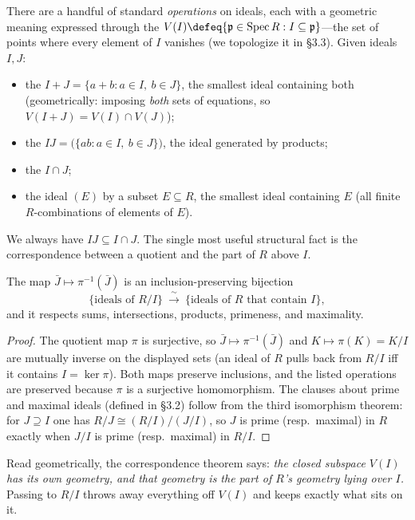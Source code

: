 \documentclass[11pt]{article}
\DeclareMathOperator{\Spec}{Spec}
\newcommand{\mfp}{\mathfrak{p}}
\begin{document}
There are a handful of standard \emph{operations} on ideals, each with a geometric meaning
expressed through the  $V(I)\defeq\{\mfp\in\Spec R: I\subseteq\mfp\}$---the
set of points where every element of $I$ vanishes (we topologize it in \S3.3). Given ideals
$I,J$:
\begin{itemize}\setlength{\itemsep}{2pt}
\item the  $I+J=\{a+b: a\in I,\ b\in J\}$, the smallest ideal containing both
(geometrically: imposing \emph{both} sets of equations, so $V(I+J)=V(I)\cap V(J)$);
\item the  $IJ=\big(\{ab:a\in I,\ b\in J\}\big)$, the ideal generated by products;
\item the  $I\cap J$;
\item the ideal $(E)$  by a subset $E\subseteq R$, the smallest ideal
containing $E$ (all finite $R$-combinations of elements of $E$).
\end{itemize}
We always have $IJ\subseteq I\cap J$. The single most useful structural fact is the
correspondence between a quotient and the part of $R$ above $I$.

\begin{pproposition}
The map $\bar J\mapsto \pi^{-1}(\bar J)$ is an inclusion-preserving bijection
\[
\{\text{ideals of } R/I\}\ \xrightarrow{\ \sim\ }\ \{\text{ideals of } R \text{ that contain } I\},
\]
and it respects sums, intersections, products, primeness, and maximality.
\end{pproposition}

\begin{proof}
The quotient map $\pi$ is surjective, so $\bar J\mapsto\pi^{-1}(\bar J)$ and
$K\mapsto \pi(K)=K/I$ are mutually inverse on the displayed sets (an ideal of $R$ pulls back
from $R/I$ iff it contains $I=\ker\pi$). Both maps preserve inclusions, and the listed
operations are preserved because $\pi$ is a surjective homomorphism. The clauses about prime
and maximal ideals (defined in \S3.2) follow from the third isomorphism theorem: for
$J\supseteq I$ one has $R/J\cong (R/I)\big/(J/I)$, so $J$ is prime (resp.\ maximal) in $R$
exactly when $J/I$ is prime (resp.\ maximal) in $R/I$.
\end{proof}

Read geometrically, the correspondence theorem says: \emph{the closed subspace $V(I)$ has its
own geometry, and that geometry is the part of $R$'s geometry lying over $I$.} Passing to
$R/I$ throws away everything off $V(I)$ and keeps exactly what sits on it.
\end{document}
